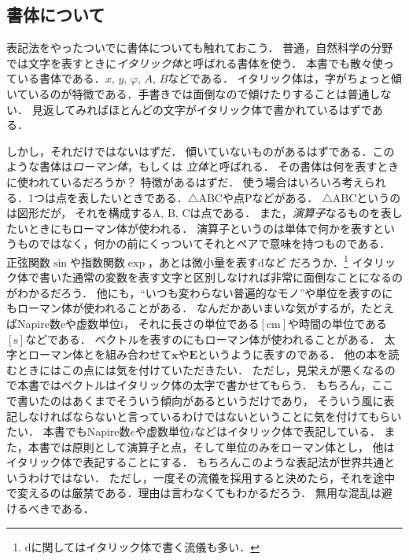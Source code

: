  \subsection{書体について}
 表記法をやったついでに書体についても触れておこう．
 普通，自然科学の分野では文字を表すときに\emph{イタリック体}と呼ばれる書体を使う．
 本書でも散々使っている書体である．$x, \, y, \, \varphi, \, A, \, B$などである．
イタリック体は，字がちょっと傾いているのが特徴である．手書きでは面倒なので傾けたりすることは普通しない．
 見返してみればほとんどの文字がイタリック体で書かれているはずである．
 
 しかし，それだけではないはずだ．
 傾いていないものがあるはずである．このような書体は\emph{ローマン体}，もしくは
 \emph{立体}と呼ばれる．
 その書体は何を表すときに使われているだろうか？ 特徴があるはずだ．
 使う場合はいろいろ考えられる．1つは点を表したいときである．$\triangle \mathrm{ABC}$や点$\mathrm{P}$などがある．
 $\triangle \mathrm{ABC}$というのは図形だが，
それを構成する$\mathrm{A}, \, \mathrm{B}, \, \mathrm{C}$は点である．
また，\emph{演算子}なるものを表したいときにもローマン体が使われる．
演算子というのは単体で何かを表すというものではなく，何かの前にくっついてそれとペアで意味を持つものである．
正弦関数$\sin$や指数関数$\exp$，あとは微小量を表す$\mathrm{d}$など
だろうか．\footnote{$\mathrm{d}$に関してはイタリック体で書く流儀も多い．}
イタリック体で書いた通常の変数を表す文字と区別しなければ非常に面倒なことになるのがわかるだろう．
他にも，``いつも変わらない普遍的なモノ''や単位を表すのにもローマン体が使われることがある．
なんだかあいまいな気がするが，たとえばNapire数$\mathrm{e}$や虚数単位$\mathrm{i}$，
それに長さの単位である$[ \mathrm{cm} ]$や時間の単位である$[ \mathrm{s} ]$などである．
ベクトルを表すのにもローマン体が使われることがある．
太字とローマン体とを組み合わせて$\mathbf{x}$や$\mathbf{E}$というように表すのである．
他の本を読むときにはこの点には気を付けていただきたい．
ただし，見栄えが悪くなるので本書ではベクトルはイタリック体の太字で書かせてもらう．
もちろん，ここで書いたのはあくまでそういう傾向があるというだけであり，
そういう風に表記しなければならないと言っているわけではないということに気を付けてもらいたい．
本書でもNapire数$e$や虚数単位$i$などはイタリック体で表記している．
また，本書では原則として演算子と点，そして単位のみをローマン体とし，
他はイタリック体で表記することにする．
もちろんこのような表記法が世界共通というわけではない．
ただし，一度その流儀を採用すると決めたら，それを途中で変えるのは厳禁である．理由は言わなくてもわかるだろう．
無用な混乱は避けるべきである．

